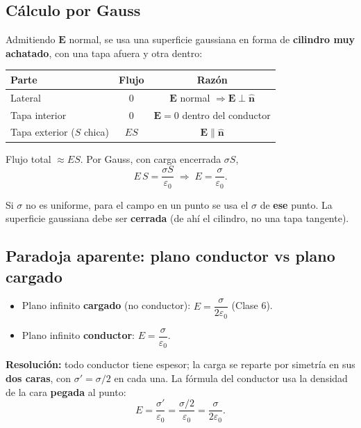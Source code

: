 \documentclass[12pt,a4paper]{article}
\begin{document}
\subsection{Cálculo por Gauss}

Admitiendo $\mathbf{E}$ normal, se usa una superficie gaussiana en forma
de \textbf{cilindro muy achatado}, con una tapa afuera y otra dentro:

\begin{center}
\begin{tabular}{lcc}
\toprule
\textbf{Parte} & \textbf{Flujo} & \textbf{Razón} \\
\midrule
Lateral            & $0$   & $\mathbf{E}$ normal $\Rightarrow \mathbf{E}\perp\hat{\mathbf{n}}$ \\
Tapa interior      & $0$   & $\mathbf{E}=0$ dentro del conductor \\
Tapa exterior ($S$ chica) & $ES$ & $\mathbf{E}\parallel\hat{\mathbf{n}}$ \\
\bottomrule
\end{tabular}
\end{center}

Flujo total $\approx ES$. Por Gauss, con carga encerrada $\sigma S$,
\[
E\,S = \frac{\sigma S}{\varepsilon_0}
\;\Longrightarrow\;
\boxed{E = \frac{\sigma}{\varepsilon_0}} .
\]

\begin{notebox}
  Si $\sigma$ no es uniforme, para el campo en un punto se usa el
  $\sigma$ de \textbf{ese} punto. La superficie gaussiana debe ser
  \textbf{cerrada} (de ahí el cilindro, no una tapa tangente).
\end{notebox}

\subsection{Paradoja aparente: plano conductor vs plano cargado}

\begin{itemize}[nosep]
  \item Plano infinito \textbf{cargado} (no conductor):
        $E = \dfrac{\sigma}{2\varepsilon_0}$ (Clase 6).
  \item Plano infinito \textbf{conductor}:
        $E = \dfrac{\sigma}{\varepsilon_0}$.
\end{itemize}

\textbf{Resolución:} todo conductor tiene espesor; la carga se reparte
por simetría en sus \textbf{dos caras}, con $\sigma' = \sigma/2$ en cada
una. La fórmula del conductor usa la densidad de la cara \textbf{pegada}
al punto:
\[
E = \frac{\sigma'}{\varepsilon_0} = \frac{\sigma/2}{\varepsilon_0}
  = \frac{\sigma}{2\varepsilon_0} .
\]
\end{document}
